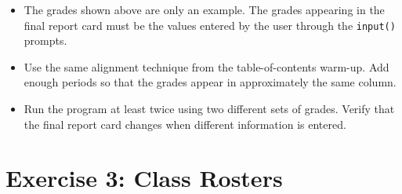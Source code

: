 \documentclass{article}
\begin{document}
\begin{enumerate}
\begin{itemize}
\item The grades shown above are only an example.  The grades appearing in the final report card must be the values entered by the user through the \texttt{input()} prompts. \\ \vspace{0.25cm}

\item Use the same alignment technique from the table-of-contents warm-up.  Add enough periods so that the grades appear in approximately the same column. \\ \vspace{0.25cm}

\item Run the program at least twice using two different sets of grades.  Verify that the final report card changes when different information is entered. \\ \vspace{0.5cm}

\end{itemize}
\end{enumerate}


\section{Exercise 3: Class Rosters}
\end{document}
